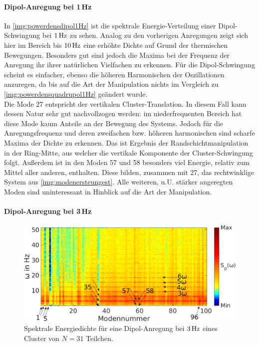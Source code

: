 \documentclass[numbers=noenddot,a4paper,notitlepage,twoside,BCOR15mm]{scrbook}
\begin{document}
						\paragraph{Dipol-Anregung bei 1\,Hz}

							In \ref{img:powerdensdipol1Hz} ist die spektrale Energie-Verteilung einer Dipol-Schwingung bei $\unit[1]{Hz}$ zu sehen. Analog zu den vorherigen Anregungen zeigt sich hier im Bereich bis $\unit[10]{Hz}$ eine erhöhte Dichte auf Grund der thermischen Bewegungen. Besonders gut sind jedoch die Maxima bei der Frequenz der Anregung ihr ihrer natürlichen Vielfachen zu erkennen. Für die Dipol-Schwingung scheint es einfacher, ebenso die höheren Harmonischen der Oszillationen anzuregen, da bis auf die Art der Manipulation nichts im Vergleich zu \ref{img:powerdensquadrupol1Hz} geändert wurde.\\
							Die Mode 27 entspricht der vertikalen Cluster-Translation. In diesem Fall kann dessen Natur sehr gut nachvollzogen werden: im niederfrequenten Bereich hat diese Mode kaum Anteile an der Bewegung des Systems. Jedoch für die Anregungsfrequenz und deren zweifachen bzw. höheren harmonischen sind scharfe Maxima der Dichte zu erkennen. Das ist Ergebnis der Randschichtmanipulation in der Ring-Mitte, aus welcher die vertikale Komponente der Cluster-Schwingung folgt. Außerdem ist in den Moden 57 und 58 besonders viel Energie, relativ zum Mittel aller anderen, enthalten. Diese bilden, zusammen mit 27, das rechtwinklige System aus \ref{img:modenersteungest}. Alle weiteren, u.U. stärker angeregten Moden sind uninteressant in Hinblick auf die Art der Manipulation.

						\paragraph{Dipol-Anregung bei 3\,Hz}

							\begin{figure}[!t]
								\centering
								\includegraphics[width=\textwidth]{figs/auswertung/manipulation/dipol3Hzpowerdens.png}
								\caption{Spektrale Energiedichte für eine Dipol-Anregung  bei $\unit[3]{Hz}$ eines Cluster von $N=31$ Teilchen.}\label{img:powerdensdipol3Hz}
							\end{figure}
\end{document}
